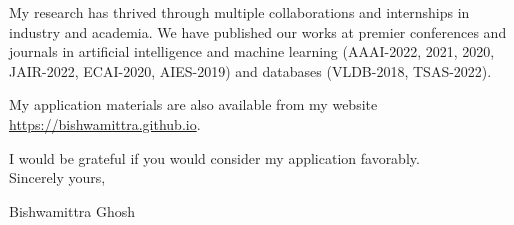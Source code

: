 \documentclass[a4paper,10pt]{article}
\newcommand{\blue}[1]{\textcolor{blue}{#1}}
\begin{document}
	\vspace{1em}
	My research has thrived through multiple collaborations and internships in industry and academia. We have published our works at premier conferences and journals in artificial intelligence and machine learning (AAAI-2022, 2021, 2020, JAIR-2022, ECAI-2020, AIES-2019) and databases (VLDB-2018, TSAS-2022).
	
	\vspace{1em}
	My application materials are also available from my website \blue{\url{https://bishwamittra.github.io}}.
	
	
	\vspace{1em}
	I would be grateful if you would consider my application favorably.\\
	Sincerely yours,
	
	\vspace{1em}
	Bishwamittra Ghosh
	

\end{document}
